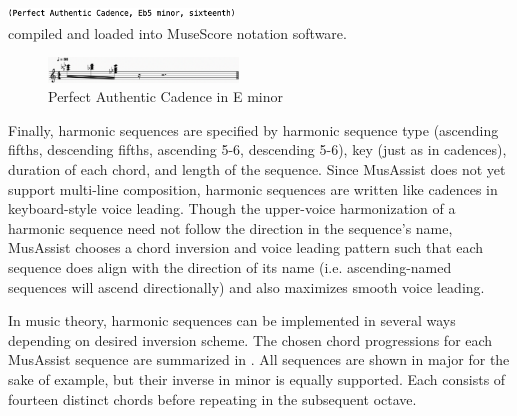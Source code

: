 \documentclass{article}
\begin{document}
\vspace{1mm}
\noindent\includegraphics[width=0.45\textwidth]{images/perfauth_code}\\
\vspace{-2mm}
\noindent compiled and loaded into MuseScore notation software.
\vspace{-1mm}
\begin{figure}[h!]
\centering
\includegraphics[width=0.45\textwidth]{images/perfauth}
  \caption{Perfect Authentic Cadence in E\musFlat\; minor \label{fig:perfauth}}
  \vspace{-3mm}
\end{figure}

Finally, harmonic sequences are specified by harmonic sequence type (ascending fifths,
descending fifths, ascending 5-6, descending 5-6), key (just as in cadences), duration of each chord,
and length of the sequence. Since MusAssist does not yet support multi-line composition, harmonic sequences are 
written like cadences in keyboard-style voice leading. Though the
upper-voice harmonization of a harmonic sequence need not follow the direction in the sequence’s
name, MusAssist chooses a chord inversion and voice leading pattern such that each sequence does
align with the direction of its name (i.e. ascending-named sequences will ascend directionally) 
and also maximizes smooth voice leading.

In music theory, harmonic sequences can be implemented in several ways depending on desired inversion scheme. 
The chosen chord progressions for each MusAssist sequence are summarized in .
All sequences are shown in major for the sake of example, but their inverse in minor is equally supported. 
Each consists of fourteen distinct chords before repeating in the subsequent octave. 
\end{document}

